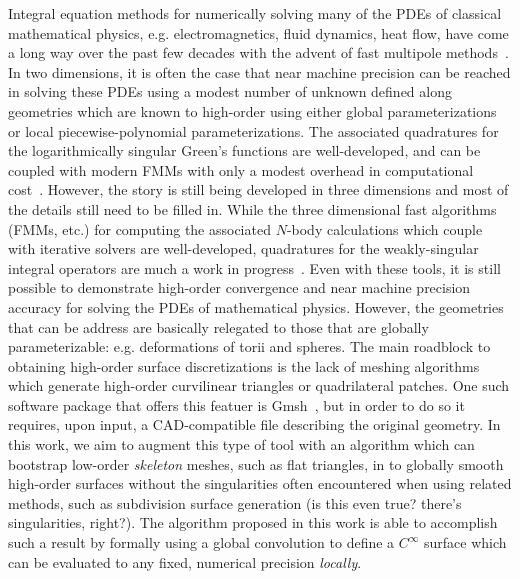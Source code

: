 \documentclass[11pt, oneside]{article}
\begin{document}
Integral equation methods for numerically 
solving many of the PDEs of classical mathematical
physics, e.g. electromagnetics, fluid dynamics, heat flow, have come a long
way over the past few decades with the advent of fast multipole 
methods~\cite{}. In two dimensions, it is often the case that near machine 
precision can be reached in solving these PDEs using a modest number of unknown
defined along geometries which are known to high-order using either global
parameterizations or local piecewise-polynomial parameterizations. The associated
quadratures for the logarithmically singular Green's functions are 
well-developed, and can be coupled with modern FMMs with only a modest overhead
in computational cost~\cite{qbxfmm,etc}. However, the story is still being developed
in three dimensions and most of the details still need to be filled in.
While the three dimensional fast algorithms (FMMs, etc.) for computing the
associated $N$-body calculations which couple with iterative solvers are well-developed,
quadratures for the weakly-singular integral operators are much a work in
progress~\cite{qbx3d,bremer,bruno}.
Even with these tools, it is still possible to demonstrate high-order convergence
and near machine precision accuracy for solving the PDEs of mathematical physics. However,
the geometries that can be address are basically 
relegated to those that are globally parameterizable: e.g. deformations of torii and spheres.
The main roadblock to obtaining high-order surface discretizations is the lack of
meshing algorithms which generate high-order curvilinear triangles or quadrilateral patches.
One such software package that offers this featuer is Gmsh~\cite{gmsh}, but in order to do so
it requires, upon input, a CAD-compatible file describing the original geometry.
In this work, we aim to augment this type of tool with an algorithm which can bootstrap
low-order \emph{skeleton} meshes, such as flat triangles, in to globally smooth high-order
surfaces without the singularities often encountered when using related methods, such as
subdivision surface generation (is this even true? there's singularities, right?). The algorithm
proposed in this work is able to accomplish such a result by formally using a global
convolution to define a $C^\infty$ surface which can be evaluated to any fixed, numerical precision
\emph{locally}.
\end{document}
